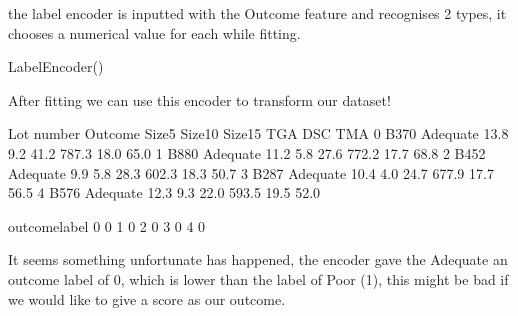 \documentclass[letterpaper,10pt,english]{jupyterBook}
\begin{document}
\sphinxAtStartPar
the label encoder is inputted with the Outcome feature and recognises 2 types, it chooses a numerical value for each while fitting.

\begin{sphinxVerbatim}[commandchars=\\\{\}]
  
\end{sphinxVerbatim}

\begin{sphinxVerbatim}[commandchars=\\\{\}]
LabelEncoder()
\end{sphinxVerbatim}

\sphinxAtStartPar
After fitting we can use this encoder to transform our dataset!

\begin{sphinxVerbatim}[commandchars=\\\{\}]
\PYG{p}{[}\PYG{p}{]}  
\end{sphinxVerbatim}

\begin{sphinxVerbatim}[commandchars=\\\{\}]
  Lot number   Outcome  Size5  Size10  Size15    TGA   DSC   TMA  \PYGZbs{}
0       B370  Adequate   13.8     9.2    41.2  787.3  18.0  65.0   
1       B880  Adequate   11.2     5.8    27.6  772.2  17.7  68.8   
2       B452  Adequate    9.9     5.8    28.3  602.3  18.3  50.7   
3       B287  Adequate   10.4     4.0    24.7  677.9  17.7  56.5   
4       B576  Adequate   12.3     9.3    22.0  593.5  19.5  52.0   

   outcome\PYGZus{}label  
0              0  
1              0  
2              0  
3              0  
4              0  
\end{sphinxVerbatim}

\sphinxAtStartPar
It seems something unfortunate has happened, the encoder gave the Adequate an outcome label of 0, which is lower than the label of Poor (1), this might be bad if we would like to give a score as our outcome.
\end{document}

